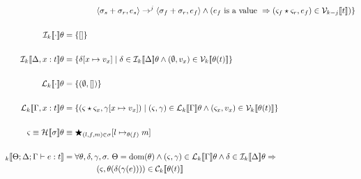 \begin{align*}
               & \qquad \qquad \langle \sigma_s + \sigma_r, e_s \rangle \rightarrow^j \langle \sigma_f + \sigma_r, e_f \rangle \wedge ( e_f \textrm { is a value } \Rightarrow ( \varsigma_f \star \varsigma_r, e_f ) \in \V{k-j}{t} ) \} \\
\\
    \den{I}{k}{ \cdot } \theta &= \{ [] \} \\
\\
    \den{I}{k}{ \Delta, x : t } \theta &= \{ \delta[x \mapsto v_x ] \mid \delta \in \den{I}{k}{\Delta}\theta \wedge (\empH, v_x) \in \V{k}{\theta(t)} \} \\
\\
    \den{L}{k}{ \cdot } \theta &= \{ (\empH, []) \} \\
\\
    \den{L}{k}{ \Gamma, x : t } \theta &= \{ (\varsigma \star \varsigma_x, \gamma[x \mapsto v_x ]) \mid (\varsigma, \gamma) \in \den{L}{k}{\Gamma}\theta \wedge (\varsigma_x, v_x) \in \V{k}{\theta(t)} \} \\
\\
    \varsigma \equiv \den{H}{}{\sigma}\theta &\equiv \bigstar_{(l,f,m) \in \sigma} [ l \mapsto_{\theta(f)} m ]\\
\\
\den{}{k}{ \Theta; \Delta ; \Gamma \vdash e : t } &= \forall \theta, \delta, \gamma, \sigma.\ \Theta = \dom(\theta) \wedge (\varsigma, \gamma) \in \den{L}{k}{ \Gamma }\theta \wedge \delta \in \den{I}{k}{ \Delta }\theta \Rightarrow \\
                                                 & \qquad \qquad (\varsigma, \theta(\delta(\gamma(e)))) \in \C{k}{ \theta(t) }
\end{align*}
